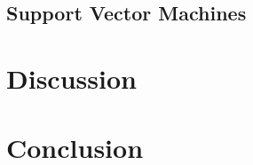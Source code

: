 \documentclass[nofootinbib,reprint,english]{revtex4-1}
\begin{document}
\subsection{Support Vector Machines}


\section{Discussion}

\section{Conclusion}

%




%
%
\end{document}

